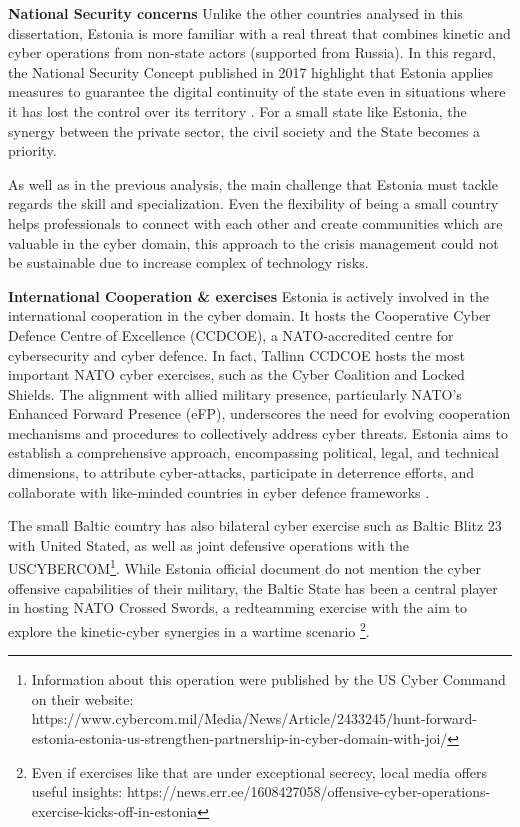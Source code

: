 \textbf{National Security concerns} Unlike the other countries analysed in this dissertation, Estonia is more familiar with a real threat that combines kinetic and cyber operations from non-state actors (supported from Russia). In this regard, the National Security Concept published in 2017 highlight that Estonia applies measures to guarantee the digital continuity of the state even in situations where it has lost the control over its territory \autocite[16]{republicofestonia_2017_national}. For a small state like Estonia, the synergy between the private sector, the civil society and the State becomes a priority.  

As well as in the previous analysis, the main challenge that Estonia must tackle regards the skill and specialization. Even the flexibility of being a small country helps professionals to connect with each other and create communities which are valuable in the cyber domain, this approach to the crisis management could not be sustainable due to increase complex of technology risks.  

\textbf{International Cooperation \& exercises} Estonia is actively involved in the international cooperation in the cyber domain. It hosts the Cooperative Cyber Defence Centre of Excellence (CCDCOE), a NATO-accredited centre for cybersecurity and cyber defence. In fact, Tallinn CCDCOE hosts the most important NATO cyber exercises, such as the Cyber Coalition and Locked Shields. The alignment with allied military presence, particularly NATO's Enhanced Forward Presence (eFP), underscores the need for evolving cooperation mechanisms and procedures to collectively address cyber threats. Estonia aims to establish a comprehensive approach, encompassing political, legal, and technical dimensions, to attribute cyber-attacks, participate in deterrence efforts, and collaborate with like-minded countries in cyber defence frameworks \autocite{ministryofeconomicaffairsandcommunication_2019_cybersecurity}. 

The small Baltic country has also bilateral cyber exercise such as Baltic Blitz 23 with United Stated, as well as joint defensive operations with the USCYBERCOM\footnote{ Information about this operation were published by the US Cyber Command on their website: https://www.cybercom.mil/Media/News/Article/2433245/hunt-forward-estonia-estonia-us-strengthen-partnership-in-cyber-domain-with-joi/}. While Estonia official document do not mention the cyber offensive capabilities of their military, the Baltic State has been a central player in hosting NATO Crossed Swords, a redteamming exercise with the aim to explore the kinetic-cyber synergies in a wartime scenario \footnote{ Even if exercises like that are under exceptional secrecy, local media offers useful insights: https://news.err.ee/1608427058/offensive-cyber-operations-exercise-kicks-off-in-estonia}. 

